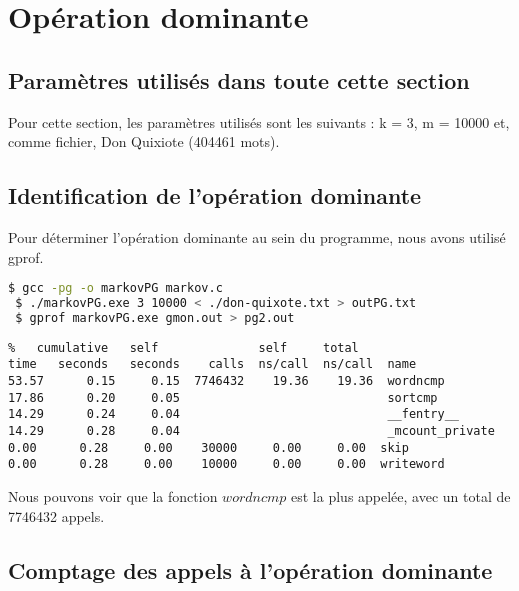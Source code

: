 
\section{Opération dominante}

\subsection{Paramètres utilisés dans toute cette section}

Pour cette section, les paramètres utilisés sont les suivants : k = 3, m = 10000 et, comme fichier, Don Quixiote (404461 mots).

\subsection{Identification de l'opération dominante}

Pour déterminer l'opération dominante au sein du programme, nous avons utilisé gprof.


\begin{lstlisting}[language=bash]
 $ gcc -pg -o markovPG markov.c
 $ ./markovPG.exe 3 10000 < ./don-quixote.txt > outPG.txt
 $ gprof markovPG.exe gmon.out > pg2.out
\end{lstlisting}

\begin{verbatim}
%   cumulative   self              self     total           
time   seconds   seconds    calls  ns/call  ns/call  name    
53.57      0.15     0.15  7746432    19.36    19.36  wordncmp
17.86      0.20     0.05                             sortcmp
14.29      0.24     0.04                             __fentry__
14.29      0.28     0.04                             _mcount_private
0.00      0.28     0.00    30000     0.00     0.00  skip
0.00      0.28     0.00    10000     0.00     0.00  writeword
\end{verbatim}
Nous pouvons voir que la fonction $wordncmp$ est la plus appelée, avec un total de 7746432 appels.





\subsection{Comptage des appels à l'opération dominante}

